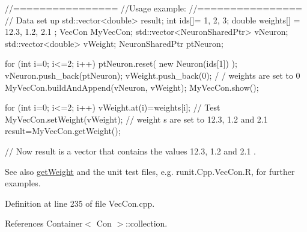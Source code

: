 \begin{DoxyCode}
        //================
        //Usage example:
        //================
        // Data set up
                std::vector<double> result;
                        int ids[]= {1, 2, 3};
                        double weights[] = {12.3, 1.2, 2.1 };
                        VecCon MyVecCon;
                        std::vector<NeuronSharedPtr> vNeuron;
                        std::vector<double> vWeight;
                        NeuronSharedPtr ptNeuron;

                        for (int i=0; i<=2; i++) {
                        ptNeuron.reset( new Neuron(ids[1]) );
                        vNeuron.push_back(ptNeuron);
                        vWeight.push_back(0);                                   /
      / weights are set to 0
                        }
                        MyVecCon.buildAndAppend(vNeuron, vWeight);
                        MyVecCon.show();

                        for (int i=0; i<=2; i++) {
                                vWeight.at(i)=weights[i];
                        }
        // Test
                        MyVecCon.setWeight(vWeight);                    // weight
      s are set to 12.3, 1.2 and 2.1
                        result=MyVecCon.getWeight();

        // Now result is a vector that contains the values 12.3, 1.2 and 2.1 .
\end{DoxyCode}


\begin{DoxySeeAlso}{See also}
\hyperlink{classvec_con_a76f10669494f2247d036ae6a1f296873}{getWeight} and the unit test files, e.g. runit.Cpp.VecCon.R, for further examples. 
\end{DoxySeeAlso}


Definition at line 235 of file VecCon.cpp.



References Container$<$ Con $>$::collection.


